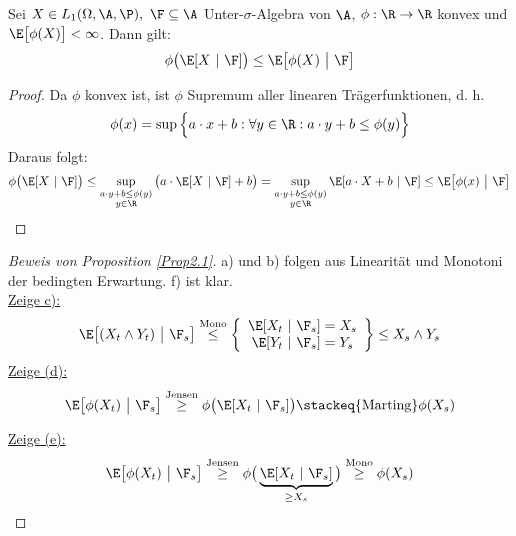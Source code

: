 \begin{lemma}\label{lemma2.2BedingteJensenscheUngleichung}\enter
Sei $X\in L_1(\Omega,\A,\P),~\F\subseteq\A$ Unter-$\sigma$-Algebra von $\A$, $\phi:\R\to\R$ konvex und\\ $\E\big[\phi(X)\big]<\infty$. Dann gilt:
\begin{align*}
\phi\big(\E[X~|~\F]\big)\leq\E\big[\phi(X)~\big|~\F\big]
\end{align*}
\end{lemma}
\begin{proof}
Da $\phi$ konvex ist, ist $\phi$ Supremum aller linearen Trägerfunktionen, d. h.
\begin{align*}
\phi(x)=\sup\Big\lbrace a\cdot x+b:\forall y\in \R: a\cdot y+b\leq\phi(y)\Big\rbrace
\end{align*}
Daraus folgt:
\begin{align*}
\phi\big(\E[X~|~\F]\big)
\leq\sup\limits_{\begin{subarray}{c}a\cdot y+b\leq\phi(y)\\y\in\R\end{subarray}}\big(a\cdot\E[X~|~\F]+b\big)
=\sup\limits_{\begin{subarray}{c}a\cdot y+b\leq\phi(y)\\y\in\R\end{subarray}}
\E[a\cdot X+b~|~\F]
\leq
\E\big[\phi(x)~\big|~\F\big]
\end{align*}
\end{proof}

\begin{proof}[Beweis von Proposition \ref{Prop2.1}]\enter
a) und b) folgen aus Linearität und Monotoni der bedingten Erwartung. f) ist klar.\\

\underline{Zeige c):}
\begin{align*}
\E\big[(X_t\wedge Y_t)~\big|~\F_s\big]
\stackrel{\text{Mono}}{\leq}
\left\lbrace\begin{array}{c}
\E[X_t~|~\F_s]=X_s\\
\E[Y_t~|~\F_s]=Y_s\\
\end{array}\right\rbrace
\leq X_s\wedge Y_s
\end{align*}
\underline{Zeige (d):}
\begin{align*}
\E\big[\phi(X_t)~\big|~\F_s\big]
\stackrel{\text{Jensen}}{\geq}
\phi\big(\E[X_t~|~\F_s]\big)
\stackeq{\text{Marting}}
\phi(X_s)
\end{align*}

\underline{Zeige (e):}
\begin{align*}
\E\big[\phi(X_t)~\big|~\F_s\big]
\stackrel{\text{Jensen}}{\geq}
\phi\big(\underbrace{\E[X_t~|~\F_s]}_{\geq X_s}\big)
\stackrel{\text{Mono}}{\geq}
\phi(X_s)
\end{align*}
\end{proof}

